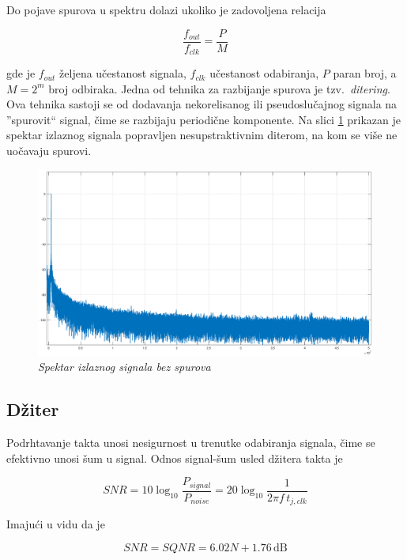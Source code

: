 \documentclass[conference]{IEEEtran}
\begin{document}
Do pojave spurova u spektru dolazi ukoliko je zadovoljena relacija 

\begin{equation}
	\frac{f_{out}}{f_{clk}} = \frac{P}{M}
\end{equation}

\noindent gde je $f_{out}$ željena učestanost signala, $f_{clk}$ učestanost odabiranja, $P$ paran broj, a $M=2^m$ broj odbiraka. Jedna od tehnika za razbijanje spurova je tzv.~\textsl{ditering}. Ova tehnika sastoji se od dodavanja nekorelisanog ili pseudoslučajnog signala na ''spurovit`` signal, čime se razbijaju periodične komponente. Na slici \ref{slika:nospur} prikazan je spektar izlaznog signala popravljen nesupstraktivnim diterom, na kom se više ne uočavaju spurovi.

\begin{figure}[h]
	\centering
	\includegraphics[scale=0.15]{./slike/nospur.eps}
	\caption{\textsl{Spektar izlaznog signala bez spurova}}
	\label{slika:nospur}
\end{figure}

\subsection{Džiter}
Podrhtavanje takta unosi nesigurnost u trenutke odabiranja signala, čime se efektivno unosi šum u signal. Odnos signal-šum usled džitera takta je 

\begin{equation}
SNR = 10\log_{10}\frac{P_{signal}}{P_{noise}}=20\log_{10}\frac{1}{2\pi f\,t_{j,clk}}
\end{equation}

Imajući u vidu da je 

\begin{equation}
SNR = SQNR = 6.02N + 1.76\, \text{dB}
\end{equation}
\end{document}
